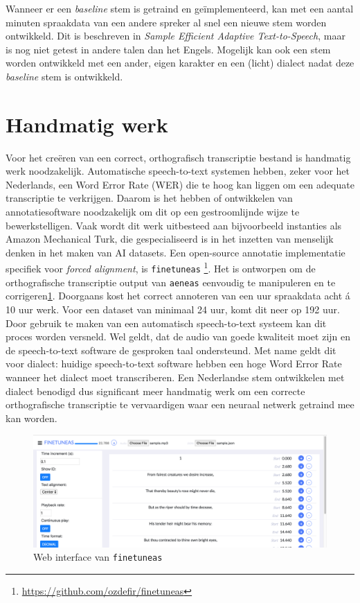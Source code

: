 Wanneer er een \textit{baseline} stem is getraind en geïmplementeerd, kan met een aantal minuten spraakdata van een andere spreker al snel een nieuwe stem worden ontwikkeld. Dit is beschreven in \textit{Sample Efficient Adaptive Text-to-Speech}, maar is nog niet getest in andere talen dan het Engels. Mogelijk kan ook een stem worden ontwikkeld met een ander, eigen karakter en een (licht) dialect nadat deze \textit{baseline} stem is ontwikkeld.

\section{Handmatig werk}
Voor het creëren van een correct, orthografisch transcriptie bestand is handmatig werk noodzakelijk. Automatische speech-to-text systemen hebben, zeker voor het Nederlands, een Word Error Rate (WER) die te hoog kan liggen om een adequate transcriptie te verkrijgen. Daarom is het hebben of ontwikkelen van annotatiesoftware noodzakelijk om dit op een gestroomlijnde wijze te bewerkstelligen. Vaak wordt dit werk uitbesteed aan bijvoorbeeld instanties als Amazon Mechanical Turk, die gespecialiseerd is in het inzetten van menselijk denken in het maken van AI datasets. Een open-source annotatie implementatie specifiek voor \textit{forced alignment}, is \texttt{finetuneas} \footnote{\url{https://github.com/ozdefir/finetuneas}}. Het is ontworpen om de orthografische transcriptie output van \texttt{aeneas} eenvoudig te manipuleren en te corrigeren\ref{fig:finetuneas}. Doorgaans kost het correct annoteren van een uur spraakdata acht á 10 uur werk. Voor een dataset van minimaal 24 uur, komt dit neer op 192 uur. Door gebruik te maken van een automatisch speech-to-text systeem kan dit proces worden versneld. Wel geldt, dat de audio van goede kwaliteit moet zijn en de speech-to-text software de gesproken taal ondersteund. Met name geldt dit voor dialect: huidige speech-to-text software hebben een hoge Word Error Rate wanneer het dialect moet transcriberen. Een Nederlandse stem ontwikkelen met dialect benodigd dus significant meer handmatig werk om een correcte orthografische transcriptie te vervaardigen waar een neuraal netwerk getraind mee kan worden.

\begin{figure}[H]
    \centering
    \includegraphics[width=\textwidth]{figures/finetuneas.png}
    \caption{Web interface van \texttt{finetuneas}}
    \label{fig:finetuneas}
\end{figure}


